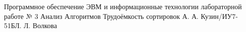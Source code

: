 \documentclass{bmstu}
\begin{document}
{Программное обеспечение ЭВМ и информационные технологии}
{лабораторной работе № 3}
{Анализ Алгоритмов}
{Трудоёмкость сортировок}
{}{А. А. Кузин/ИУ7-51Б}{Л. Л. Волкова}


\renewcommand{\contentsname}{Содержание}
\tableofcontents
\setcounter{page}{2}






\makebibliography
\end{document}
